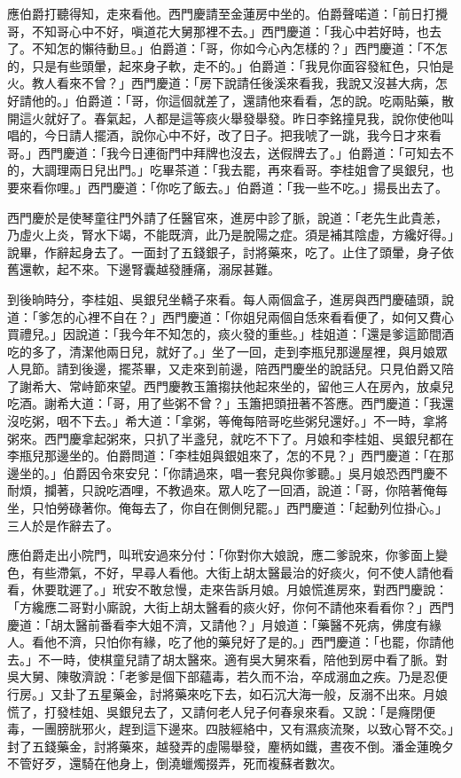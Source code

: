 應伯爵打聽得知，走來看他。西門慶請至金蓮房中坐的。伯爵聲喏道：「前日打攪哥，不知哥心中不好，嗔道花大舅那裡不去。」西門慶道：「我心中若好時，也去了。不知怎的懶待動旦。」伯爵道：「哥，你如今心內怎樣的？」西門慶道：「不怎的，只是有些頭暈，起來身子軟，走不的。」伯爵道：「我見你面容發紅色，只怕是火。教人看來不曾？」西門慶道：「房下說請任後溪來看我，我說又沒甚大病，怎好請他的。」伯爵道：「哥，你這個就差了，還請他來看看，怎的說。吃兩貼藥，散開這火就好了。春氣起，人都是這等痰火舉發舉發。昨日李銘撞見我，說你使他叫唱的，今日請人擺酒，說你心中不好，改了日子。把我唬了一跳，我今日才來看哥。」西門慶道：「我今日連衙門中拜牌也沒去，送假牌去了。」伯爵道：「可知去不的，大調理兩日兒出門。」吃畢茶道：「我去罷，再來看哥。李桂姐會了吳銀兒，也要來看你哩。」西門慶道：「你吃了飯去。」伯爵道：「我一些不吃。」揚長出去了。

西門慶於是使琴童往門外請了任醫官來，進房中診了脈，說道：「老先生此貴恙，乃虛火上炎，腎水下竭，不能既濟，此乃是脫陽之症。須是補其陰虛，方纔好得。」說畢，作辭起身去了。一面封了五錢銀子，討將藥來，吃了。止住了頭暈，身子依舊還軟，起不來。下邊腎囊越發腫痛，溺尿甚難。

到後晌時分，李桂姐、吳銀兒坐轎子來看。每人兩個盒子，進房與西門慶磕頭，說道：「爹怎的心裡不自在？」西門慶道：「你姐兒兩個自恁來看看便了，如何又費心買禮兒。」因說道：「我今年不知怎的，痰火發的重些。」桂姐道：「還是爹這節間酒吃的多了，清潔他兩日兒，就好了。」坐了一回，走到李瓶兒那邊屋裡，與月娘眾人見節。請到後邊，擺茶畢，又走來到前邊，陪西門慶坐的說話兒。只見伯爵又陪了謝希大、常峙節來望。西門慶教玉簫搊扶他起來坐的，留他三人在房內，放桌兒吃酒。謝希大道：「哥，用了些粥不曾？」玉簫把頭扭著不答應。西門慶道：「我還沒吃粥，咽不下去。」希大道：「拿粥，等俺每陪哥吃些粥兒還好。」不一時，拿將粥來。西門慶拿起粥來，只扒了半盞兒，就吃不下了。月娘和李桂姐、吳銀兒都在李瓶兒那邊坐的。伯爵問道：「李桂姐與銀姐來了，怎的不見？」西門慶道：「在那邊坐的。」伯爵因令來安兒：「你請過來，唱一套兒與你爹聽。」吳月娘恐西門慶不耐煩，攔著，只說吃酒哩，不教過來。眾人吃了一回酒，說道：「哥，你陪著俺每坐，只怕勞碌著你。俺每去了，你自在側側兒罷。」西門慶道：「起動列位掛心。」三人於是作辭去了。

應伯爵走出小院門，叫玳安過來分付：「你對你大娘說，應二爹說來，你爹面上變色，有些滯氣，不好，早尋人看他。大街上胡太醫最治的好痰火，何不使人請他看看，休要耽遲了。」玳安不敢怠慢，走來告訴月娘。月娘慌進房來，對西門慶說：「方纔應二哥對小廝說，大街上胡太醫看的痰火好，你何不請他來看看你？」西門慶道：「胡太醫前番看李大姐不濟，又請他？」月娘道：「藥醫不死病，佛度有緣人。看他不濟，只怕你有緣，吃了他的藥兒好了是的。」西門慶道：「也罷，你請他去。」不一時，使棋童兒請了胡太醫來。適有吳大舅來看，陪他到房中看了脈。對吳大舅、陳敬濟說：「老爹是個下部蘊毒，若久而不治，卒成溺血之疾。乃是忍便行房。」又卦了五星藥金，討將藥來吃下去，如石沉大海一般，反溺不出來。月娘慌了，打發桂姐、吳銀兒去了，又請何老人兒子何春泉來看。又說：「是癃閉便毒，一團膀胱邪火，趕到這下邊來。四肢經絡中，又有濕痰流聚，以致心腎不交。」封了五錢藥金，討將藥來，越發弄的虛陽舉發，麈柄如鐵，晝夜不倒。潘金蓮晚夕不管好歹，還騎在他身上，倒澆蠟燭掇弄，死而複蘇者數次。

